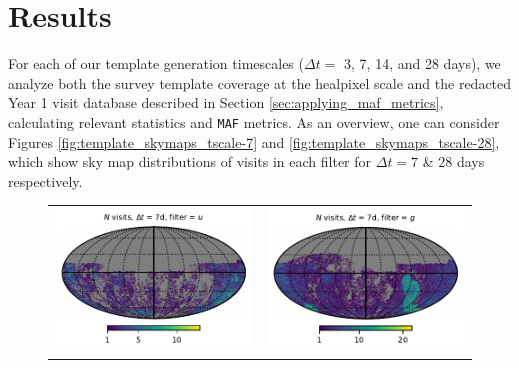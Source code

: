 \documentclass[preprintm,linenumbers]{aastex631}
\newcommand{\maf}{\texttt{MAF}\xspace}
\begin{document}
		
		\section{Results}
		\label{sec:results}
		
		For each of our template generation timescales ($\Delta t =$ 3, 7, 14, and 28 days), we analyze both the survey template coverage at the healpixel scale and the redacted Year 1 visit database described in Section \ref{sec:applying_maf_metrics}, calculating relevant statistics and \maf metrics. 
  As an overview, one can consider Figures \ref{fig:template_skymaps_tscale-7} and  \ref{fig:template_skymaps_tscale-28}, which show sky map distributions of visits in each filter for $\Delta t = 7$ \& $28$ days respectively.


		
  		\begin{figure}
			\centering
			\begin{tabular}{@{}c@{}c@{}}
				\includegraphics{results/skymaps/skymap_first_year_one_snap_v4_0_10yrs_db_noDD_noTwi_tscale-7_nside-256_doAllTemplateMetrics_reduceCount_u_noDD_noTwi.pdf} &
				\includegraphics{results/skymaps/skymap_first_year_one_snap_v4_0_10yrs_db_noDD_noTwi_tscale-7_nside-256_doAllTemplateMetrics_reduceCount_g_noDD_noTwi.pdf} \\

\end{tabular}
\end{figure}
\end{document}
